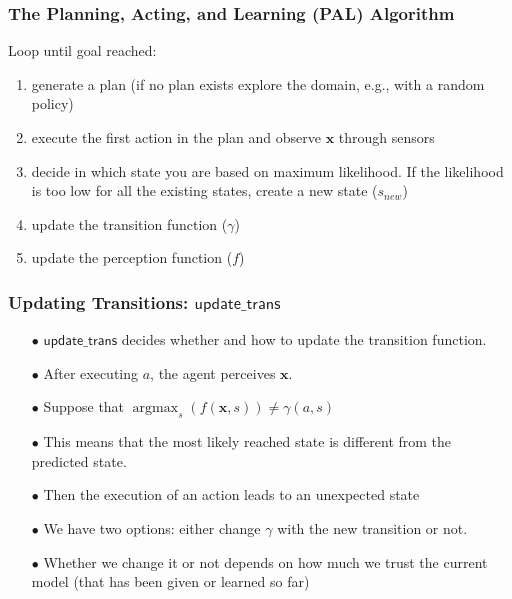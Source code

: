 \documentclass{beamer}
\DeclareMathOperator*{\argmax}{argmax}
\def\updgamma{\mathsf{update\_trans}}
\def\bx{\pmb{x}}
\begin{document}
\begin{frame}
\frametitle{The Planning, Acting, and Learning (PAL) Algorithm}
Loop until goal reached: 
\begin{enumerate}
\item generate a plan (if no plan exists explore the domain, e.g., with a random policy) 
\item execute the first action in the plan and observe $\bx$ through sensors
\item decide in which state you are based on maximum likelihood. If the likelihood  is too low for all the existing states, create a new state ($s_{new}$)
\item \alert<2>{update the transition function ($\gamma$)} 
\item update the perception function ($f$)
\end{enumerate}
\end{frame}



\begin{frame} 
  \frametitle{Updating Transitions: $\updgamma$} 

\begin{itemize}
\item[$\bullet$] 
$\updgamma$ decides whether and how to update the transition function.
\pause
\item[$\bullet$]
After executing $a$, the agent perceives $\bx$. 
\pause
\item[$\bullet$]
Suppose that $\argmax_{s}(f(\bx,s)) \neq \gamma(a,s)$
\pause
\item[$\bullet$]
This means that the most likely reached state is different from the predicted state.
\pause
\item[$\bullet$]
Then the execution of an action leads to an unexpected state
\pause
\item[$\bullet$]
We have two options: either change $\gamma$ with the new transition or not.
\pause
\item[$\bullet$]
{\color {red} Whether we change it or not depends on how much we trust the current model (that has been given or learned so far)}
\end{itemize}
\end{frame}
\end{document}
